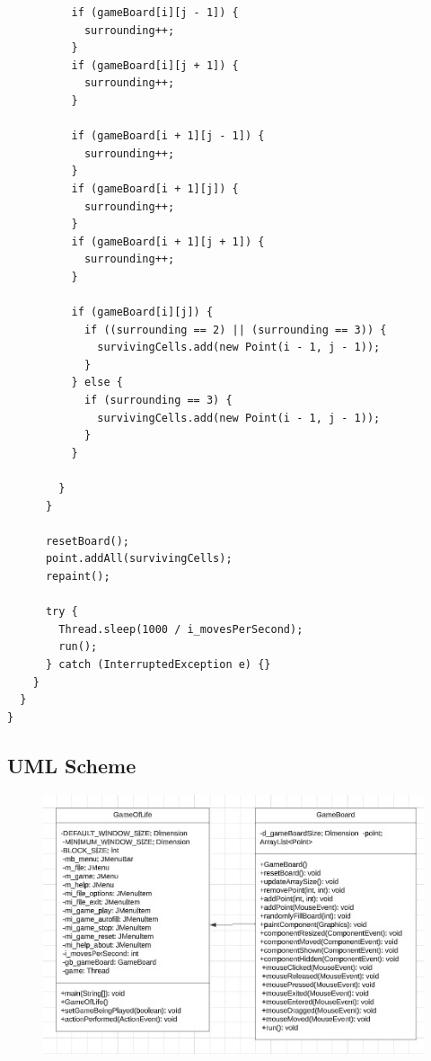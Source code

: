 \documentclass[12pt]{article}
\begin{document}
\begin{lstlisting}
          if (gameBoard[i][j - 1]) {
            surrounding++;
          }
          if (gameBoard[i][j + 1]) {
            surrounding++;
          }

          if (gameBoard[i + 1][j - 1]) {
            surrounding++;
          }
          if (gameBoard[i + 1][j]) {
            surrounding++;
          }
          if (gameBoard[i + 1][j + 1]) {
            surrounding++;
          }

          if (gameBoard[i][j]) {
            if ((surrounding == 2) || (surrounding == 3)) {
              survivingCells.add(new Point(i - 1, j - 1));
            }
          } else {
            if (surrounding == 3) {
              survivingCells.add(new Point(i - 1, j - 1));
            }
          }

        }
      }

      resetBoard();
      point.addAll(survivingCells);
      repaint();

      try {
        Thread.sleep(1000 / i_movesPerSecond);
        run();
      } catch (InterruptedException e) {}
    }
  }
}
  \end{lstlisting}

  \subsection*{UML Scheme}
  \begin{figure}[ht]
    \includegraphics[center]{uml.jpg}
  \end{figure}
\end{document}
